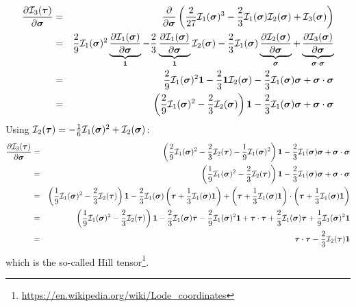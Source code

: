 \begin{eqnarray}
\frac{\partial {\cal I}_3(\bm\tau)}{\partial \bm\sigma} 
&=&
\frac{\partial }{\partial \bm\sigma} 
\left( \frac{2}{27} {\cal I}_1(\bm\sigma)^3 
- \frac{2}{3} {\cal I}_1(\bm\sigma){\cal I}_2(\bm\sigma) + {\cal I}_3(\bm\sigma) \right) \nonumber\\
&=& 
\frac{2}{9} {\cal I}_1(\bm\sigma)^2  
\underbrace{ \frac{\partial  {\cal I}_1(\bm\sigma)}{\partial \bm\sigma} }_{\bm 1} 
-\frac23 
\underbrace{ \frac{\partial {\cal I}_1(\bm\sigma)}{\partial \bm\sigma}}_{\bm 1}   {\cal I}_2(\bm\sigma) 
-\frac23 {\cal I}_1(\bm\sigma)  
\underbrace{ \frac{\partial  {\cal I}_2(\bm\sigma)}{\partial \bm\sigma} }_{\bm \sigma}
+ 
\underbrace{\frac{\partial {\cal I}_3(\bm\sigma)}{\partial \bm\sigma}}_{\bm\sigma\cdot\bm\sigma}  \nonumber\\
&=& 
\frac{2}{9} {\cal I}_1(\bm\sigma)^2 {\bm 1} 
-\frac23 {\bm 1}   {\cal I}_2(\bm\sigma) 
-\frac23 {\cal I}_1(\bm\sigma)  {\bm \sigma}
+ \bm\sigma\cdot\bm\sigma \nonumber\\
&=& \left(\frac29 {\cal I}_1(\bm\sigma)^2 - \frac23  {\cal I}_2(\bm\sigma)    \right)  {\bm 1}
-\frac23 {\cal I}_1(\bm\sigma)  {\bm \sigma}
+ \bm\sigma\cdot\bm\sigma
\end{eqnarray}
Using ${\cal I}_2(\bm\tau) = -\frac16 {\cal I}_1(\bm\sigma)^2 + {\cal I}_2(\bm\sigma)$:
\begin{eqnarray}
\frac{\partial {\cal I}_3(\bm\tau)}{\partial \bm\sigma} 
&=& \left(\frac29 {\cal I}_1(\bm\sigma)^2 - \frac23  {\cal I}_2(\bm\tau) 
-\frac19 {\cal I}_1(\bm\sigma)^2    \right)  {\bm 1}
-\frac23 {\cal I}_1(\bm\sigma)  {\bm \sigma}
+ \bm\sigma\cdot\bm\sigma \nonumber\\
&=& \left(\frac19 {\cal I}_1(\bm\sigma)^2 - \frac23  {\cal I}_2(\bm\tau) \right)  {\bm 1}
-\frac23 {\cal I}_1(\bm\sigma)  {\bm \sigma}
+ \bm\sigma\cdot\bm\sigma \nonumber\\
&=& \left(\frac19 {\cal I}_1(\bm\sigma)^2 - \frac23  {\cal I}_2(\bm\tau) \right)  {\bm 1}
-\frac23 {\cal I}_1(\bm\sigma)  \left( \bm\tau + \frac13 {\cal I}_1(\bm\sigma) {\bm 1} \right)
+ \left( \bm\tau + \frac13 {\cal I}_1(\bm\sigma) {\bm 1} \right)
\cdot \left( \bm\tau + \frac13 {\cal I}_1(\bm\sigma) {\bm 1} \right) \nonumber\\
&=& \left(\frac19 {\cal I}_1(\bm\sigma)^2 - \frac23  {\cal I}_2(\bm\tau) \right)  {\bm 1}
-\frac23 {\cal I}_1(\bm\sigma)  \bm\tau 
-\frac29 {\cal I}_1(\bm\sigma)^2   {\bm 1}
+ \bm\tau\cdot\bm\tau
+\frac23  {\cal I}_1(\bm\sigma) \bm\tau
+\frac19 {\cal I}_1(\bm\sigma)^2   {\bm 1} \nonumber\\
&=&
\bm\tau\cdot\bm\tau
-
\frac23  {\cal I}_2(\bm\tau)  {\bm 1}
\end{eqnarray}
which is the so-called Hill tensor\footnote{\url{https://en.wikipedia.org/wiki/Lode_coordinates}}.

